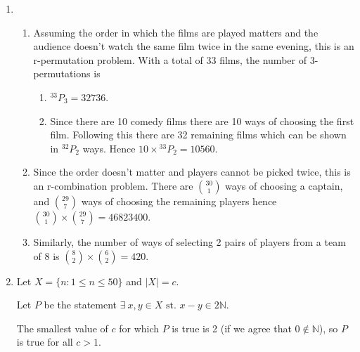\documentclass[10pt]{article}
\newcommand*{\perm}[2]{{}^{#1}\!P_{#2}}%
\begin{document}
\begin{enumerate}
\begin{enumerate}
        \end{enumerate}
        \item
        \begin{enumerate}
            \item Assuming the order in which the films are played matters and
                the audience doesn't watch the same film twice in the same
                evening, this is an r-permutation problem.  With a total of 33
                films, the number of 3-permutations is 
                \begin{enumerate}
                    \item $\perm{33}{3} =32736$.
                    \item Since there are 10 comedy films there are 10 ways of
                        choosing the first film. Following this there are 32
                        remaining films which can be shown in $\perm{32}{2}$ ways.
                        Hence $10 \times \perm{33}{2} = 10560$.
                \end{enumerate}
            \item Since the order doesn't matter and players cannot be picked
                twice, this is an r-combination problem. There are
                $\binom{30}{1}$ ways of choosing a captain, and $\binom{29}{7}$
                ways of choosing the remaining players hence $\binom{30}{1}
                \times \binom{29}{7} = 46823400$.
            \item Similarly, the number of ways of selecting 2 pairs of players
                from a team of 8 is $\binom{8}{2} \times \binom{6}{2} = 420$.
        \end{enumerate}
            \item Let $X = \{n : 1 \leq n \leq 50\}$ and $|X| = c$.

                Let $P$ be the statement $\exists\ x, y \in X \text{ st. } x -
                y \in 2 \mathbb{N}$.

                The smallest value of $c$ for which $P$ is true is 2 (if we
                agree that $0 \notin \mathbb{N}$), so $P$ is true for all $c >
                1$.


\end{enumerate}
\end{document}

